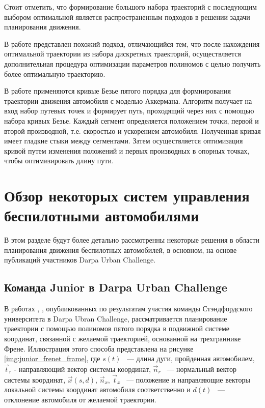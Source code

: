 Стоит отметить, что формирование большого набора траекторий с последующим выбором оптимальной является распространенным
подходов в решении задачи планирования движения.

В работе \cite{motion_planning_interpolate_path_optimization} представлен похожий подход, отличающийся тем, что после
нахождения оптимальной траектории из набора дискретных траекторий, осуществляется дополнительная процедура оптимизации
параметров полиномов с целью получить более оптимальную траекторию.

В работе \cite{motion_planning_interpolate_bezier} применяются кривые Безье пятого порядка для формиирования траектории
движения автомобиля с моделью Аккермана. Алгоритм получает на вход набор путевых точек и формирует путь, проходящий
через них с помощью набора кривых Безье. Каждый сегмент определяется положением точки, первой и второй производной, т.е.
скоростью и ускорением автомобиля. Полученная кривая имеет гладкие стыки между сегментами. Затем осуществляется
оптимизация кривой путем изменения положений и первых производных в опорных точках, чтобы оптимизировать длину пути.

\section{Обзор некоторых систем управления беспилотными автомобилями}

В этом разделе будут более детально рассмотренны некоторые решения в области планирования движения беспилотных автомобилей,
в основном, на основе публикаций участников Darpa Urban Challenge.

\subsection{Команда Junior в Darpa Urban Challenge}

В работах \cite{darpa_junior_path_planning_1}, \cite{darpa_junior_frenet},
опубликованных по результатам участия команды Стэндфордского университета в Darpa Ubran Challenge,
рассматривается планирование траектории с помощью полиномов пятого порядка в подвижной системе координат,
связанной с желаемой траекторией, основанной на трехграннике Френе. Иллюстрация этого способа представлена на
рисунке \ref{img:junior_frenet_frame}, где
$s(t)$  ~--- длина дуги, пройденная автомобилем, $\vec{t}_r$ - направляющий вектор системы координат,
$\vec{n}_r$  ~--- нормальный вектор системы координат, $\vec{x}(s,d)$, $\vec{n}_x$,
$\vec{t}_x$ ~--- положение и направляющие векторы локальной системы координат автомобиля соответственно и
$d(t)$ ~--- отклонение автомобиля от желаемой траектории.

